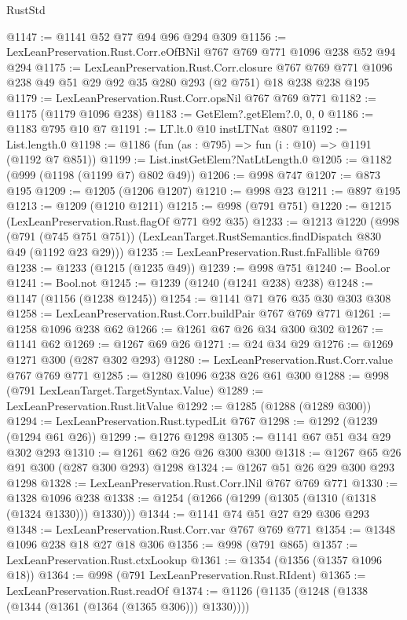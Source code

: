 \begin{lexlean}{RustStd}
\begin{coremodule}
{\begin{coremodule}
{{{{{{{@1147 := @1141 @52 @77 @94 @96 @294 @309
@1156 := LexLeanPreservation.Rust.Corr.eOfBNil @767 @769 @771 @1096 @238 @52 @94 @294
@1175 := LexLeanPreservation.Rust.Corr.closure
    @767
    @769
    @771
    @1096
    @238
    @49
    @51
    @29
    @92
    @35
    @280
    @293
    (@2 @751)
    @18
    @238
    @238
    @195
@1179 := LexLeanPreservation.Rust.Corr.opsNil @767 @769 @771
@1182 := @1175 (@1179 @1096 @238)
@1183 := GetElem?.getElem?.{0, 0, 0}
@1186 := @1183 @795 @10 @7
@1191 := LT.lt.{0} @10 instLTNat @807
@1192 := List.length.{0}
@1198 := @1186 (fun (as : @795) => fun (i : @10) => @1191 (@1192 @7 @851))
@1199 := List.instGetElem?NatLtLength.{0}
@1205 := @1182 (@999 (@1198 (@1199 @7) @802 @49))
@1206 := @998 @747
@1207 := @873 @195
@1209 := @1205 (@1206 @1207)
@1210 := @998 @23
@1211 := @897 @195
@1213 := @1209 (@1210 @1211)
@1215 := @998 (@791 @751)
@1220 := @1215 (LexLeanPreservation.Rust.flagOf @771 @92 @35)
@1233 := @1213
    @1220
    (@998
      (@791 (@745 @751 @751))
      (LexLeanTarget.RustSemantics.findDispatch @830 @49 (@1192 @23 @29)))
@1235 := LexLeanPreservation.Rust.fnFallible @769
@1238 := @1233 (@1215 (@1235 @49))
@1239 := @998 @751
@1240 := Bool.or
@1241 := Bool.not
@1245 := @1239 (@1240 (@1241 @238) @238)
@1248 := @1147 (@1156 (@1238 @1245))
@1254 := @1141 @71 @76 @35 @30 @303 @308
@1258 := LexLeanPreservation.Rust.Corr.buildPair @767 @769 @771
@1261 := @1258 @1096 @238 @62
@1266 := @1261 @67 @26 @34 @300 @302
@1267 := @1141 @62
@1269 := @1267 @69 @26
@1271 := @24 @34 @29
@1276 := @1269 @1271 @300 (@287 @302 @293)
@1280 := LexLeanPreservation.Rust.Corr.value @767 @769 @771
@1285 := @1280 @1096 @238 @26 @61 @300
@1288 := @998 (@791 LexLeanTarget.TargetSyntax.Value)
@1289 := LexLeanPreservation.Rust.litValue
@1292 := @1285 (@1288 (@1289 @300))
@1294 := LexLeanPreservation.Rust.typedLit @767
@1298 := @1292 (@1239 (@1294 @61 @26))
@1299 := @1276 @1298
@1305 := @1141 @67 @51 @34 @29 @302 @293
@1310 := @1261 @62 @26 @26 @300 @300
@1318 := @1267 @65 @26 @91 @300 (@287 @300 @293) @1298
@1324 := @1267 @51 @26 @29 @300 @293 @1298
@1328 := LexLeanPreservation.Rust.Corr.lNil @767 @769 @771
@1330 := @1328 @1096 @238
@1338 := @1254 (@1266 (@1299 (@1305 (@1310 (@1318 (@1324 @1330))) @1330)))
@1344 := @1141 @74 @51 @27 @29 @306 @293
@1348 := LexLeanPreservation.Rust.Corr.var @767 @769 @771
@1354 := @1348 @1096 @238 @18 @27 @18 @306
@1356 := @998 (@791 @865)
@1357 := LexLeanPreservation.Rust.ctxLookup
@1361 := @1354 (@1356 (@1357 @1096 @18))
@1364 := @998 (@791 LexLeanPreservation.Rust.RIdent)
@1365 := LexLeanPreservation.Rust.readOf
@1374 := @1126 (@1135 (@1248 (@1338 (@1344 (@1361 (@1364 (@1365 @306))) @1330))))
}}}}}}}
\end{coremodule}}
\end{coremodule}
\end{lexlean}
